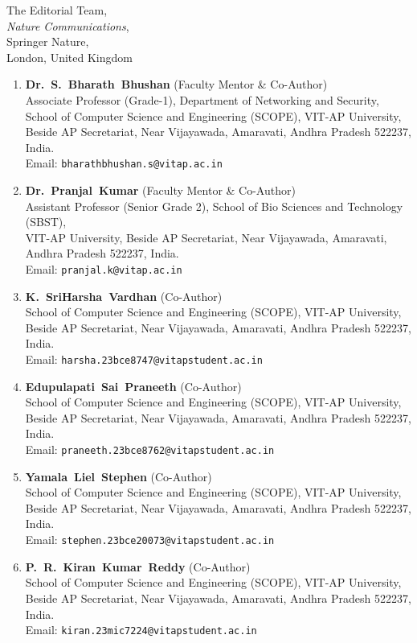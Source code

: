 \documentclass[11pt]{letter}
\begin{document}
\begin{letter}{%
    The Editorial Team,\\
    \textit{Nature Communications},\\
    Springer Nature,\\
    London, United Kingdom
}
\begin{enumerate}
    \item \textbf{Dr.~S.~Bharath~Bhushan} (Faculty Mentor \& Co-Author)\\
    Associate Professor (Grade-1), Department of Networking and Security,\\
    School of Computer Science and Engineering (SCOPE), VIT-AP University,\\
    Beside AP Secretariat, Near Vijayawada, Amaravati, Andhra Pradesh 522237, India.\\
    Email: \texttt{bharathbhushan.s@vitap.ac.in}

    \item \textbf{Dr.~Pranjal~Kumar} (Faculty Mentor \& Co-Author)\\
    Assistant Professor (Senior Grade 2), School of Bio Sciences and Technology (SBST),\\
    VIT-AP University, Beside AP Secretariat, Near Vijayawada, Amaravati, Andhra Pradesh 522237, India.\\
    Email: \texttt{pranjal.k@vitap.ac.in}

    \item \textbf{K.~SriHarsha~Vardhan} (Co-Author)\\
    School of Computer Science and Engineering (SCOPE), VIT-AP University,\\
    Beside AP Secretariat, Near Vijayawada, Amaravati, Andhra Pradesh 522237, India.\\
    Email: \texttt{harsha.23bce8747@vitapstudent.ac.in}

    \item \textbf{Edupulapati~Sai~Praneeth} (Co-Author)\\
    School of Computer Science and Engineering (SCOPE), VIT-AP University,\\
    Beside AP Secretariat, Near Vijayawada, Amaravati, Andhra Pradesh 522237, India.\\
    Email: \texttt{praneeth.23bce8762@vitapstudent.ac.in}

    \item \textbf{Yamala~Liel~Stephen} (Co-Author)\\
    School of Computer Science and Engineering (SCOPE), VIT-AP University,\\
    Beside AP Secretariat, Near Vijayawada, Amaravati, Andhra Pradesh 522237, India.\\
    Email: \texttt{stephen.23bce20073@vitapstudent.ac.in}

    \item \textbf{P.~R.~Kiran~Kumar~Reddy} (Co-Author)\\
    School of Computer Science and Engineering (SCOPE), VIT-AP University,\\
    Beside AP Secretariat, Near Vijayawada, Amaravati, Andhra Pradesh 522237, India.\\
    Email: \texttt{kiran.23mic7224@vitapstudent.ac.in}
\end{enumerate}


\end{letter}
\end{document}
